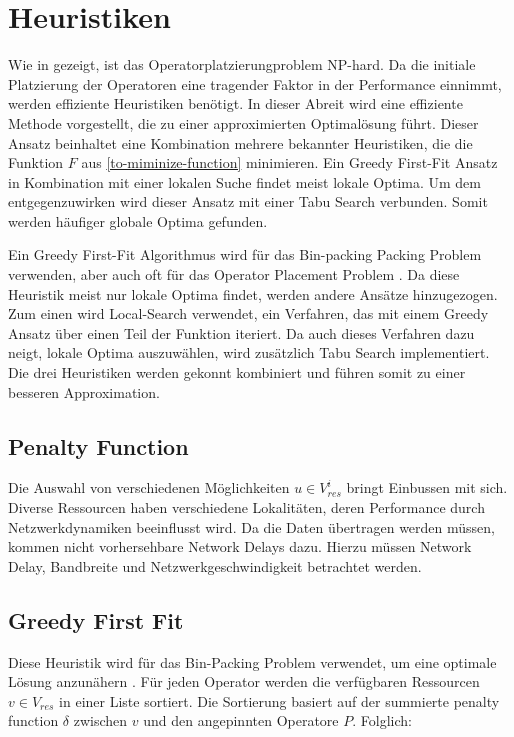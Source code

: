 \documentclass{article}
\begin{document}
\section{Heuristiken}
Wie in \cite{cardellini-optimal_operatorplc} gezeigt, ist das 
Operatorplatzierungproblem NP-hard.
Da die initiale Platzierung der Operatoren eine tragender Faktor
in der Performance einnimmt, werden effiziente Heuristiken benötigt. 
In dieser Abreit wird eine effiziente Methode vorgestellt, die 
zu einer approximierten Optimalösung führt. 
Dieser Ansatz beinhaltet eine Kombination mehrere bekannter Heuristiken, die die Funktion $F$ aus \ref{to-miminize-function} minimieren.  
Ein Greedy First-Fit Ansatz in Kombination mit einer lokalen Suche findet meist lokale Optima. 
Um dem entgegenzuwirken wird dieser Ansatz mit einer Tabu Search verbunden. 
Somit werden häufiger \cite{k3} globale Optima gefunden. 

Ein Greedy First-Fit Algorithmus wird für das Bin-packing Packing Problem verwenden, 
aber auch oft für das Operator Placement Problem \cite{k7}\cite{k8}.
Da diese Heuristik meist nur lokale Optima findet, werden andere Ansätze hinzugezogen. 
Zum einen wird Local-Search verwendet, ein Verfahren, 
das mit einem Greedy Ansatz über einen Teil der Funktion iteriert. Da auch dieses
Verfahren dazu neigt, lokale Optima auszuwählen, wird zusätzlich Tabu Search implementiert. 
Die drei Heuristiken werden gekonnt kombiniert und führen somit zu einer besseren Approximation. 

\subsection{Penalty Function} 
Die Auswahl von verschiedenen Möglichkeiten $u \in V_{res}^i$ bringt Einbussen mit sich. Diverse Ressourcen haben verschiedene Lokalitäten,
deren Performance durch Netzwerkdynamiken beeinflusst wird. Da die Daten übertragen werden müssen, kommen nicht vorhersehbare Network Delays dazu. Hierzu müssen Network Delay, 
Bandbreite und Netzwerkgeschwindigkeit\cite{k3} betrachtet werden.


\subsection{Greedy First Fit} \label{greedy-first-fit}
Diese Heuristik wird  für das Bin-Packing Problem verwendet, um eine optimale Lösung anzunähern \cite{greedy-first-fit}. 
Für jeden Operator werden die verfügbaren Ressourcen $v \in V_{res}$ in einer Liste sortiert. Die Sortierung basiert auf der summierte penalty function $\delta$
zwischen $v$ und den angepinnten Operatore $P$. Folglich:
\end{document}
